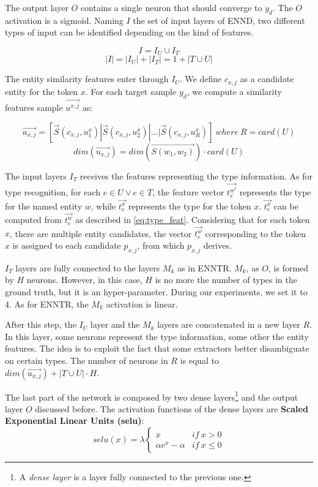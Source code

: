 \documentclass{llncs}
\begin{document}
The output layer $O$ contains a single neuron that should converge to $y_d$. The $O$ activation is a sigmoid. Naming $I$ the set of input layers of ENND, two different types of input can be identified depending on the kind of features.

$$I = I_U \cup I_T$$
$$\left\vert{I}\right\vert= \left\vert{I_U}\right\vert + \left\vert{I_T}\right\vert = 1 + \left\vert{T \cup U}\right\vert$$

The entity similarity features enter through $I_U$. We define $c_{x,j}$  as a candidate entity for the token $x$. For each target sample $y_d$, we compute a similarity features sample $\vec{u^{x,j}}$ as:

$$\vec{u_{x,j}} = [\vec{S}(c_{x,j},u^{x}_{1})|\vec{S}(c_{x,j},u^{x}_{2})|...|\vec{S}(c_{x,j},u^{x}_{R})] \: where \: R = card(U)$$
$$dim(\vec{u_{x,j}}) = dim(\vec{S(w_1,w_2)}) \cdot  card(U) $$

The input layers $I_T$ receives the features representing the type information. As for type recognition, for each $e \in U \lor e \in T$, the feature vector $\vec{t^{w^{t}}_{e}}$ represents the type for the named entity $w$, while $\vec{t^{x}_{e}}$ represents the type for the token $x$. $\vec{t^{x}_{e}}$ can be computed from $\vec{t^{w}_{e}}$ as described in \ref{eq:type_feat}. Considering that for each token $x$, there are multiple entity candidates, the vector $\vec{t^{w}_{e}}$ corresponding to the token $x$ is assigned to each candidate $p_{x,j}$, from which $p_{x,j}$ derives.

$I_T$ layers are fully connected to the layers $M_k$ as in ENNTR. $M_k$, as $O$, is formed by $H$ neurons. However, in this case, $H$ is no more the number of types in the ground truth, but it is an hyper-parameter. During our experiments, we set it to 4. As for ENNTR, the $M_k$ activation is linear.
 
After this step, the $I_U$ layer and the $M_k$ layers are concatenated in a new layer $R$. In this layer, some neurons represent the type information, some other the entity features. The idea is to exploit the fact that some extractors better disambiguate on certain types. The number of neurons in $R$ is equal to $dim(\vec{u_{x,j}}) + \left\vert{T \cup U}\right\vert \cdot H$.

The last part of the network is composed by two dense layers\footnote{A \textit{dense layer} is a layer fully connected to the previous one.} and the output layer $O$ discussed before. The activation functions of the dense layers are \textbf{Scaled Exponential Linear Units (selu)}:
$$selu(x) = \lambda \left\{\begin{matrix} 
x & if \: x > 0\\
\alpha e^{x} - \alpha & if \: x \leq 0 
\end{matrix}\right.$$
\end{document}
